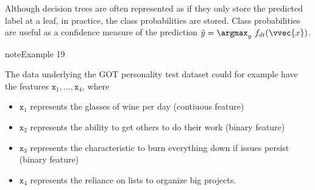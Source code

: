 \documentclass[letterpaper,10pt,english]{jupyterBook}
\begin{document}
\sphinxAtStartPar
Although decision trees are often represented as if they only store the predicted label at a leaf, in practice, the class probabilities are stored. Class probabilities are useful as a confidence measure of the prediction \( \hat{y} = \argmax_y\ f_{dt}(\vvec{x}) \).
\label{classification_decision_trees:example-1}
\begin{sphinxadmonition}{note}{Example 19}



\sphinxAtStartPar
The data underlying the GOT personality test dataset could for example have the features \(\mathtt{x}_1,\ldots,\mathtt{x}_4\), where
\begin{itemize}
\item {} 
\sphinxAtStartPar
\(\mathtt{x}_1\) represents the glasses of wine per day (contiuous feature)

\item {} 
\sphinxAtStartPar
\(\mathtt{x}_2\) represents the ability to get others to do their work (binary feature)

\item {} 
\sphinxAtStartPar
\(\mathtt{x}_3\) represents the characteristic to burn everything down if issues persist (binary feature)

\item {} 
\sphinxAtStartPar
\(\mathtt{x}_4\) represents the reliance on lists to organize big projects.

\end{itemize}


\end{sphinxadmonition}
\end{document}
